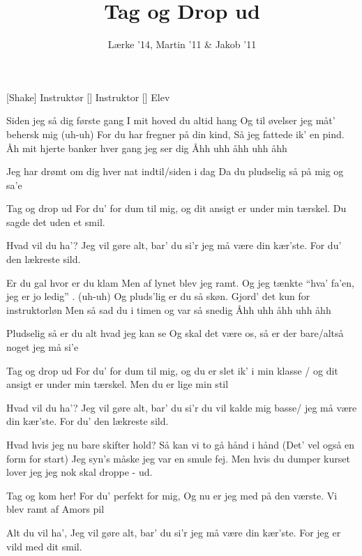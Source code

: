 \documentclass[a4paper,11pt]{article}
\title{Tag og Drop ud}
\author{Lærke '14, Martin '11 \& Jakob '11}
\begin{document}
\maketitle

\begin{roles}
[Shake] Instruktør
[] Instruktor
[] Elev
\end{roles}

\begin{song}
 Siden jeg så dig første gang  
I mit hoved du altid hang
Og til øvelser jeg måt’ behersk mig (uh-uh) 
For du har fregner på din kind,
Så jeg fattede ik’ en pind. 
Åh mit hjerte banker hver gang jeg ser dig 
Åhh uhh åhh uhh åhh


 Jeg har drømt om dig hver nat indtil/siden i dag
Da du pludselig så på mig og sa'e 


 Tag og drop ud 
For du’ for dum til mig, 
og dit ansigt er under min tærskel. 
 Du sagde det uden et smil. %

 Hvad vil du ha’? 
Jeg vil gøre alt, bar’ du si’r jeg må være din kær’ste. 
For du’ den lækreste sild.



 Er du gal hvor er du klam
Men af lynet blev jeg ramt.
Og jeg tænkte “hva’ fa’en, jeg er jo ledig” . (uh-uh) 
Og pluds’lig er du så skøn.
Gjord’ det kun for instruktorløn 
Men så sad du i timen og var så snedig
Åhh uhh åhh uhh åhh


 Pludselig så er du alt hvad jeg kan se
Og skal det være os, så er der bare/altså noget jeg må si’e


 Tag og drop ud 
For du’ for dum til mig, 
og du er slet ik’ i min klasse / og dit ansigt er under min tærskel. 
 Men du er lige min stil

 Hvad vil du ha’? 
Jeg vil gøre alt, bar’ du si’r du vil kalde mig basse/ jeg må være din kær’ste. 
For du’ den lækreste sild.


 Hvad hvis jeg nu bare skifter hold?
Så kan vi to gå hånd i hånd 
 (Det’ vel også en form for start)
Jeg syn’s måske jeg var en smule fej. 
 Men hvis du dumper kurset 
 lover jeg jeg nok skal droppe - ud.  



 Tag og kom her!
For du’ perfekt for mig, 
Og nu er jeg med på den værste. 
Vi blev ramt af Amors pil 

 Alt du vil ha’, 
Jeg vil gøre alt, bar’ du si’r jeg må være din kær’ste. 
For jeg er vild med dit smil. 




\end{song}
\end{document}
